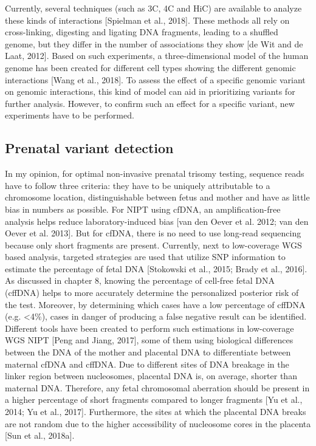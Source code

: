 {Currently, several techniques (such as 3C, 4C and HiC) are available to analyze these kinds of interactions [Spielman et al., 2018]. 
These methods all rely on cross-linking, digesting and ligating DNA fragments, leading to a shuffled genome, but they differ in the number of associations they show [de Wit and de Laat, 2012]. Based on such experiments, a three-dimensional model of the human genome has been created for different cell types showing the different genomic interactions [Wang et al., 2018]. 
To assess the effect of a specific genomic variant on genomic interactions, this kind of model can aid in prioritizing variants for further analysis. 
However, to confirm such an effect for a specific variant, new experiments have to be performed.

\subsection{Prenatal variant detection}
In my opinion, for optimal non-invasive prenatal trisomy testing, sequence reads have to follow three criteria: they have to be uniquely attributable to a chromosome location, distinguishable between
fetus and mother and have as little bias in numbers as possible. 
For NIPT using cfDNA, an amplification-free analysis helps reduce laboratory-induced bias [van den Oever et al. 2012; van den Oever et al. 2013]. 
But for cfDNA, there is no need to use long-read sequencing because only short fragments are present. 
Currently, next to low-coverage WGS based analysis, targeted strategies are used that utilize SNP information to estimate the percentage of fetal DNA [Stokowski et al., 2015; Brady et al., 2016]. 
As discussed in chapter 8, knowing the percentage of cell-free fetal DNA (cffDNA) helps to more accurately determine the personalized posterior risk of the test. 
Moreover, by determining which cases have a low percentage of cffDNA (e.g. \textless4\%), cases in danger of producing a false negative result can be identified. 
Different tools have been created to perform such estimations in low-coverage WGS NIPT [Peng and Jiang, 2017], some of them using biological differences between the DNA of the mother and placental DNA to differentiate between maternal cfDNA and cffDNA. Due to different sites of DNA breakage in the linker region between nucleosomes, placental DNA is, on average, shorter than maternal DNA. 
Therefore, any fetal chromosomal aberration should be present in a higher percentage of short fragments compared to longer fragments [Yu et al., 2014; Yu et al., 2017]. 
Furthermore, the sites at which the placental DNA breaks are not random due to the higher accessibility of nucleosome cores in the placenta [Sun et al., 2018a]. 
}
